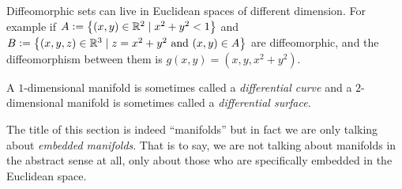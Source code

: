 \documentclass[11pt,a4paper]{article}
\begin{document}
\begin{example}
  Diffeomorphic sets can live in Euclidean spaces
  of different dimension.
  For example if $A := \left\{(x,y) \in \mathbb{R}^2 \mid x^2 + y^2 < 1\right\}$
  and $B := \left\{(x,y,z) \in \mathbb{R}^3 \mid z = x^2 + y^2 \text{ and } (x,y) \in A\right\}$
  are diffeomorphic, and the diffeomorphism between
  them is $g(x,y) = (x,y,x^2 + y^2)$.
\end{example}

\begin{remark}
  A $1$-dimensional manifold is sometimes called a 
  \textit{differential curve} and a $2$-dimensional manifold is 
  sometimes called a \textit{differential surface}.
\end{remark}

\begin{remark}
  The title of this section is indeed ``manifolds'' but in fact we
  are only talking about \textit{embedded manifolds}. That is to say,
  we are not talking about manifolds in the abstract sense at all,
  only about those who are specifically embedded in the Euclidean space.
\end{remark}
\end{document}
